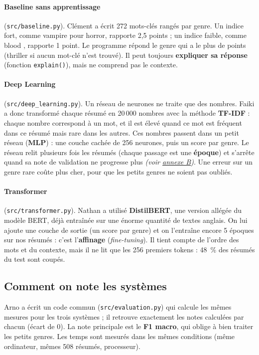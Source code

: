\documentclass[11pt,a4paper]{article}
\newcommand{\voir}[2]{{\small\textit{(voir \hyperref[#1]{#2})}}}
\begin{document}
\paragraph{Baseline sans apprentissage} (\texttt{src/baseline.py}). Clément a écrit 272 mots-clés rangés par genre. Un indice fort, comme \og vampire \fg{} pour horror, rapporte 2,5 points ; un indice faible, comme \og blood \fg{}, rapporte 1 point. Le programme répond le genre qui a le plus de points (\og thriller \fg{} si aucun mot-clé n'est trouvé). Il peut toujours \textbf{expliquer sa réponse} (fonction \texttt{explain()}), mais ne comprend pas le contexte.

\paragraph{Deep Learning} (\texttt{src/deep\_learning.py}). Un réseau de neurones ne traite que des nombres. Faiki a donc transformé chaque résumé en 20\,000 nombres avec la méthode \textbf{TF-IDF} : chaque nombre correspond à un mot, et il est élevé quand ce mot est fréquent dans ce résumé mais rare dans les autres. Ces nombres passent dans un petit réseau (\textbf{MLP}) : une couche cachée de 256 neurones, puis un score par genre. Le réseau relit plusieurs fois les résumés (chaque passage est une \textbf{époque}) et s'arrête quand sa note de validation ne progresse plus \voir{fig:loss}{annexe B}. Une erreur sur un genre rare \og coûte \fg{} plus cher, pour que les petits genres ne soient pas oubliés.

\paragraph{Transformer} (\texttt{src/transformer.py}). Nathan a utilisé \textbf{DistilBERT}, une version allégée du modèle BERT, déjà entraînée sur une énorme quantité de textes anglais. On lui ajoute une couche de sortie (un score par genre) et on l'entraîne encore 5 époques sur nos résumés : c'est l'\textbf{affinage} (\textit{fine-tuning}). Il tient compte de l'ordre des mots et du contexte, mais il ne lit que les 256 premiers tokens : 48~\% des résumés du test sont coupés.

\subsection*{Comment on note les systèmes}
\label{sec:mesures}
Arno a écrit un code commun (\texttt{src/evaluation.py}) qui calcule les mêmes mesures pour les trois systèmes ; il retrouve exactement les notes calculées par chacun (écart de 0). La note principale est le \textbf{F1 macro}, qui oblige à bien traiter les petits genres. Les temps sont mesurés dans les mêmes conditions (même ordinateur, mêmes 508 résumés, processeur).
\end{document}
